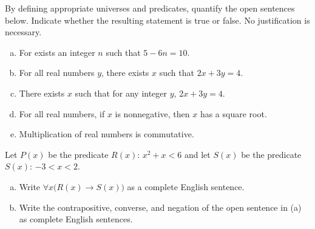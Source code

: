 \documentclass[11pt,letterpaper]{article}
\begin{document}
\newpage



 By defining appropriate universes and predicates, quantify the open sentences below. Indicate whether the resulting statement is true or false. No justification is necessary. 
	\begin{enumerate}[(a)]
	\item For exists an integer $n$ such that $5 - 6n= 10$.
	\item For all real numbers $y$, there exists $x$ such that $2x + 3y= 4$.
	\item There exists $x$ such that for any integer $y$, $2x + 3y= 4$. 
	\item For all real numbers, if $x$ is nonnegative, then $x$ has a square root. 
	\item Multiplication of real numbers is commutative. 
	\end{enumerate} 



\newpage



 Let $P(x)$ be the predicate $R(x)$: $x^2 + x < 6$ and let $S(x)$ be the predicate $S(x)$: $-3 < x < 2$.  
	\begin{enumerate}[(a)]
	\item Write $\forall x \big( R(x) \to S(x) \big)$ as a complete English sentence.
	\item Write the contrapositive, converse, and negation of the open sentence in (a) as complete English sentences. 
	\end{enumerate} 
\end{document}

